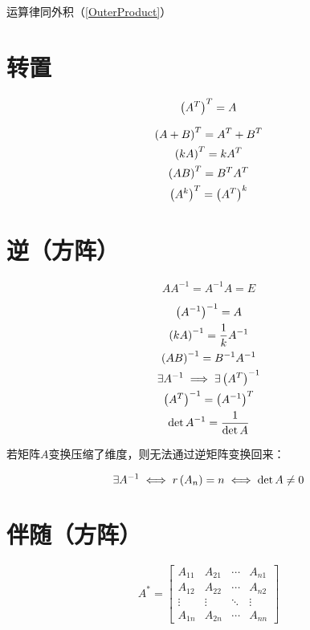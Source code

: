 \documentclass{article}
\begin{document}
运算律同外积（\ref{OuterProduct}）

\section{转置}

\begin{definition}
    \[\left(A^T\right)^T=A\]
\end{definition}

\[\begin{gathered}
        \left(A+B\right)^T=A^T+B^T\\
        \left(kA\right)^T=kA^T\\
        \left(AB\right)^T=B^TA^T\\
        \left(A^k\right)^T=\left(A^T\right)^k\\
    \end{gathered}\]

\section{逆（方阵）}

\begin{definition}
    \[AA^{-1}=A^{-1}A=E\]
\end{definition}

\[\begin{gathered}
        \left(A^{-1}\right)^{-1}=A\\
        \left(kA\right)^{-1}=\frac1k A^{-1}\\
        \left(AB\right)^{-1}=B^{-1}A^{-1}\\
        \exists A^{-1}\implies\exists\left(A^T\right)^{-1} \\
        \left(A^T\right)^{-1}=\left(A^{-1}\right)^T\\
        \det A^{-1}=\frac1{\det A}\\
    \end{gathered}\]

若矩阵$A$变换压缩了维度，则无法通过逆矩阵变换回来：

\[\exists A^{-1}\iff r\left(A_n\right)=n\iff\det A\neq0\]

\section{伴随（方阵）}

\[A^*=\begin{bmatrix}
        A_{11} & A_{21} & \cdots & A_{n1} \\
        A_{12} & A_{22} & \cdots & A_{n2} \\
        \vdots & \vdots & \ddots & \vdots \\
        A_{1n} & A_{2n} & \cdots & A_{nn}
    \end{bmatrix}\]
\end{document}
